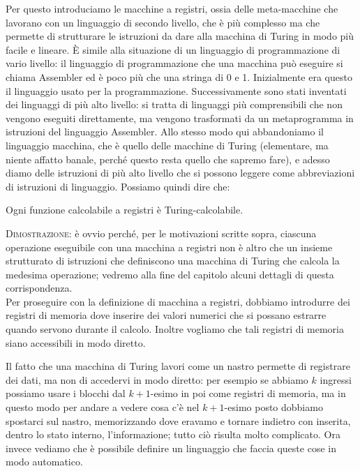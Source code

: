 Per questo introduciamo le macchine a registri, ossia delle
meta-macchine che lavorano con un linguaggio di secondo livello, che
\`e pi\`u complesso ma che permette di strutturare le istruzioni da
dare alla macchina di Turing in modo pi\`u facile e lineare. \`E
simile alla situazione di un linguaggio di programmazione di vario
livello: il linguaggio di programmazione che una macchina pu\`o
eseguire si chiama Assembler ed \`e poco pi\`u che una stringa di 0 e
1. Inizialmente era questo il linguaggio usato per la
programmazione. Successivamente sono stati inventati dei linguaggi di
pi\`u alto livello: si tratta di linguaggi pi\`u comprensibili che non
vengono eseguiti direttamente, ma vengono trasformati da un
metaprogramma in istruzioni del linguaggio Assembler. Allo stesso
modo qui abbandoniamo il linguaggio macchina, che \`e quello delle
macchine di Turing (elementare, ma niente affatto banale, perch\'e
questo resta quello che sapremo fare), e adesso diamo delle istruzioni
di pi\`u alto livello che si possono leggere come abbreviazioni di
istruzioni di linguaggio. Possiamo quindi dire che:
\begin{thm}
Ogni funzione calcolabile a registri \`e Turing-cal\-co\-la\-bi\-le.
\end{thm}
\textsc{Dimostrazione}: \`e ovvio perch\'e, per le motivazioni scritte
sopra, ciascuna operazione eseguibile con una macchina a registri non
\`e altro che un insieme strutturato di istruzioni che definiscono una
macchina di Turing che calcola la medesima operazione; vedremo alla fine del capitolo alcuni dettagli di questa corrispondenza.\\

Per proseguire con la definizione di macchina a registri, dobbiamo
introdurre dei registri di memoria dove inserire dei valori numerici
che si possano estrarre quando servono durante il calcolo. Inoltre
vogliamo che tali registri di memoria siano accessibili in modo
diretto.

Il fatto che una macchina di Turing lavori come un nastro permette di
registrare dei dati, ma non di accedervi in modo diretto: per esempio
se abbiamo \( k \) ingressi possiamo usare i blocchi dal \( k + 1
\)-esimo in poi come registri di memoria, ma in questo modo per andare
a vedere cosa c'\`e nel \( k + 1 \)-esimo posto dobbiamo spostarci sul
nastro, memorizzando dove eravamo e tornare indietro con inserita,
dentro lo stato interno, l'informazione; tutto ci\`o risulta molto
complicato. Ora invece vediamo che \`e possibile definire un
linguaggio che faccia queste cose in modo automatico.


